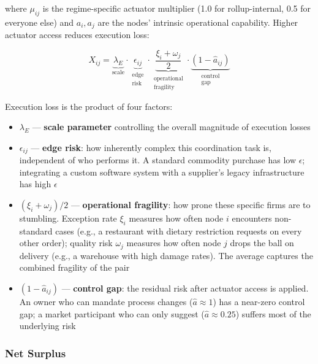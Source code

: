 \documentclass[12pt]{article}
\theoremstyle{definition}
\begin{document}
\noindent where $\mu_{ij}$ is the regime-specific actuator multiplier (1.0 for rollup-internal, 0.5 for everyone else) and $a_i, a_j$ are the nodes' intrinsic operational capability. Higher actuator access reduces execution loss:

\begin{equation}
\label{eq:execloss}
X_{ij} = \underbrace{\lambda_E}_{\text{scale}} \cdot \underbrace{\epsilon_{ij}}_{\substack{\text{edge} \\ \text{risk}}} \cdot \underbrace{\frac{\xi_i + \omega_j}{2}}_{\substack{\text{operational} \\ \text{fragility}}} \cdot \underbrace{(1 - \hat{a}_{ij})}_{\substack{\text{control} \\ \text{gap}}}
\end{equation}

\noindent Execution loss is the product of four factors:
\begin{itemize}[leftmargin=*]
\item $\lambda_E$ --- \textbf{scale parameter} controlling the overall magnitude of execution losses
\item $\epsilon_{ij}$ --- \textbf{edge risk}: how inherently complex this coordination task is, independent of who performs it. A standard commodity purchase has low $\epsilon$; integrating a custom software system with a supplier's legacy infrastructure has high $\epsilon$
\item $(\xi_i + \omega_j)/2$ --- \textbf{operational fragility}: how prone these specific firms are to stumbling. Exception rate $\xi_i$ measures how often node $i$ encounters non-standard cases (e.g., a restaurant with dietary restriction requests on every other order); quality risk $\omega_j$ measures how often node $j$ drops the ball on delivery (e.g., a warehouse with high damage rates). The average captures the combined fragility of the pair
\item $(1 - \hat{a}_{ij})$ --- \textbf{control gap}: the residual risk after actuator access is applied. An owner who can mandate process changes ($\hat{a} \approx 1$) has a near-zero control gap; a market participant who can only suggest ($\hat{a} \approx 0.25$) suffers most of the underlying risk
\end{itemize}

\subsubsection{Net Surplus}
\end{document}
